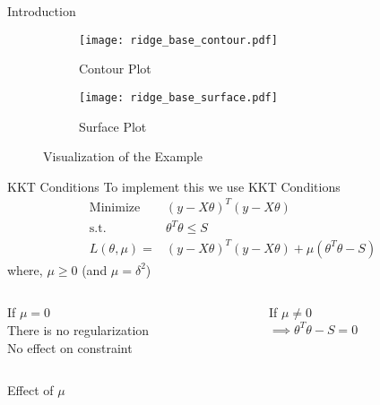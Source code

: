 \documentclass{beamer}
\begin{document}
\begin{frame}{Introduction}
\begin{figure}
        \begin{subfigure}[b]{0.5\textwidth}
                \texttt{[image: ridge\_base\_contour.pdf]}
                \caption{Contour Plot}
        \end{subfigure}%
        \begin{subfigure}[b]{0.5\textwidth}
                \texttt{[image: ridge\_base\_surface.pdf]}
                \caption{Surface Plot}
        \end{subfigure}%
        \caption{Visualization of the Example}
\end{figure}
\end{frame}

\begin{frame}{KKT Conditions}
To implement this we use KKT Conditions
\pause
\begin{align*}
\text{Minimize } & \left(y-X\theta\right)^T\left(y-X\theta\right) \\
\text{s.t. } & \theta ^T\theta \leq S \\
L\left(\theta, \mu \right) =& \left(y-X\theta\right)^T\left(y-X\theta\right) + \mu\left(\theta^T\theta - S\right)
\end{align*}
where, $\mu \geq 0$ (and $\mu = \delta^2$)\bigskip

\pause
\begin{columns}
\begin{column}{0.4\textwidth}
If $\mu = 0$ \\
There is no regularization \\
No effect on constraint
\end{column}
\pause
\begin{column}{0.4\textwidth}
If $\mu\neq 0$ \\
$\implies \theta^T\theta - S = 0$ 
\end{column}
\end{columns}
\end{frame}

\begin{frame}{Effect of $\mu$}
\vspace{0.4cm}
\end{frame}
\end{document}
